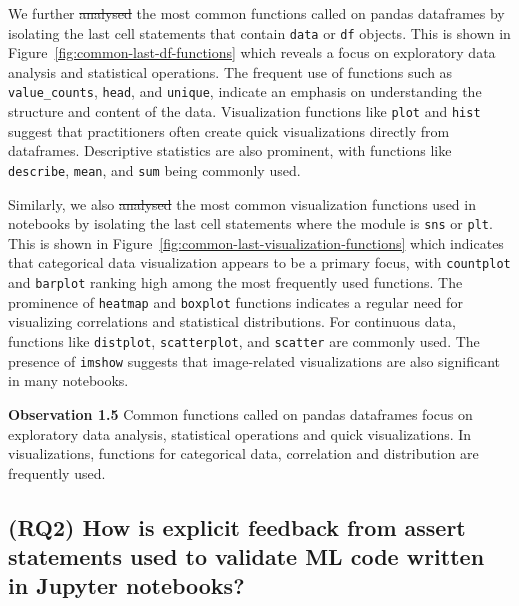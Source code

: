 \documentclass[smallextended]{svjour3}       %
\newcommand{\highlight}[1]{\begin{framed}%
  \noindent#1
\end{framed}}
\providecommand{\DIFadd}[1]{{\protect\color{blue}\uwave{#1}}} %
\providecommand{\DIFdel}[1]{{\protect\color{red}\sout{#1}}} %
\providecommand{\DIFaddbegin}{} %
\providecommand{\DIFaddend}{} %
\providecommand{\DIFdelbegin}{} %
\providecommand{\DIFdelend}{} %
\newcommand{\DIFscaledelfig}{0.5}
\newlength{\DIFdelgraphicswidth} %
\newlength{\DIFdelgraphicsheight} %
\newcommand{\DIFaddincludegraphics}[2][]{{\color{blue}\fbox{\DIFOincludegraphics[#1]{#2}}}} %
\newcommand{\DIFdelincludegraphics}[2][]{%
\sbox{\DIFdelgraphicsbox}{\DIFOincludegraphics[#1]{#2}}%
\settoboxwidth{\DIFdelgraphicswidth}{\DIFdelgraphicsbox} %
\settoboxtotalheight{\DIFdelgraphicsheight}{\DIFdelgraphicsbox} %
\scalebox{\DIFscaledelfig}{%
\parbox[b]{\DIFdelgraphicswidth}{\usebox{\DIFdelgraphicsbox}\\[-\baselineskip] \rule{\DIFdelgraphicswidth}{0em}}\llap{\resizebox{\DIFdelgraphicswidth}{\DIFdelgraphicsheight}{%
\setlength{\unitlength}{\DIFdelgraphicswidth}%
\begin{picture}(1,1)%
\thicklines\linethickness{2pt} %
{\color[rgb]{1,0,0}\put(0,0){\framebox(1,1){}}}%
{\color[rgb]{1,0,0}\put(0,0){\line( 1,1){1}}}%
{\color[rgb]{1,0,0}\put(0,1){\line(1,-1){1}}}%
\end{picture}%
}\hspace*{3pt}}} %
} %
\DeclareRobustCommand{\DIFaddbegin}{\DIFOaddbegin \let\includegraphics\DIFaddincludegraphics} %
\DeclareRobustCommand{\DIFaddend}{\DIFOaddend \let\includegraphics\DIFOincludegraphics} %
\DeclareRobustCommand{\DIFdelbegin}{\DIFOdelbegin \let\includegraphics\DIFdelincludegraphics} %
\DeclareRobustCommand{\DIFdelend}{\DIFOaddend \let\includegraphics\DIFOincludegraphics} %
\begin{document}
We further \DIFdelbegin \DIFdel{analysed }\DIFdelend \DIFaddbegin \DIFadd{analyzed }\DIFaddend the most common functions called on pandas dataframes by isolating the last cell statements that contain \lstinline{data} or \lstinline{df} objects. This is shown in Figure~\ref{fig:common-last-df-functions} which reveals a focus on exploratory data analysis and statistical operations. The frequent use of functions such as \lstinline{value_counts}, \lstinline{head}, and \lstinline{unique}, indicate an emphasis on understanding the structure and content of the data. Visualization functions like \lstinline{plot} and \lstinline{hist} suggest that practitioners often create quick visualizations directly from dataframes. Descriptive statistics are also prominent, with functions like \lstinline{describe}, \lstinline{mean}, and \lstinline{sum} being commonly used.

Similarly, we also \DIFdelbegin \DIFdel{analysed }\DIFdelend \DIFaddbegin \DIFadd{analyzed }\DIFaddend the most common visualization functions used in notebooks by isolating the last cell statements where the module is \lstinline{sns} or \lstinline{plt}. This is shown in Figure~\ref{fig:common-last-visualization-functions} which indicates that categorical data visualization appears to be a primary focus, with \lstinline{countplot} and \lstinline{barplot} ranking high among the most frequently used functions. The prominence of \lstinline{heatmap} and \lstinline{boxplot} functions indicates a regular need for visualizing correlations and statistical distributions. For continuous data, functions like \lstinline{distplot}, \lstinline{scatterplot}, and \lstinline{scatter} are commonly used. The presence of \lstinline{imshow} suggests that image-related visualizations are also significant in many notebooks.

\DIFdelbegin %
\DIFdelend \DIFaddbegin \highlight{\textbf{Observation 1.5} Common functions called on pandas dataframes focus on exploratory data analysis, statistical operations and quick visualizations. In visualizations, functions for categorical data, correlation and distribution are frequently used.}
\DIFaddend 

\subsection{(RQ2) How is explicit feedback from assert statements used to validate ML code written in Jupyter notebooks?}~\label{sec:result-explicit}
\end{document}
